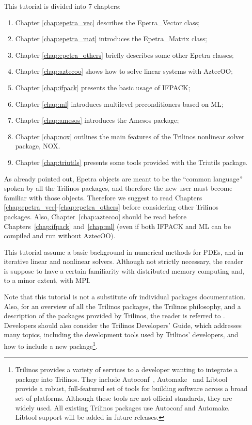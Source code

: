 This tutorial is divided into 7 chapters:
\begin{enumerate}
\item Chapter \ref{chap:epetra_vec} describes the Epetra\_Vector class;
\item Chapter \ref{chap:epetra_mat} introduces the Epetra\_Matrix
  class; 
\item Chapter \ref{chap:epetra_others} briefly describes some other
  Epetra classes;
\item Chapter \ref{chap:aztecoo} shows how to solve linear systems with
  AztecOO;
\item Chapter \ref{chap:ifpack} presents the basic usage of IFPACK;
\item Chapter \ref{chap:ml} introduces multilevel preconditioners based
  on ML;
\item Chapter \ref{chap:amesos} introduces the Amesos package;
\item Chapter \ref{chap:nox} outlines the main features of the Trilinos
  nonlinear solver package, NOX.
\item Chapter \ref{chap:triutils} presents some tools provided with the
  Triutils package. 
\end{enumerate}

\begin{remark}
  As already pointed out, Epetra objects are meant to be the ``common
  language'' spoken by all the Trilinos packages, and therefore the new
  user must become familiar with those objects. Therefore we suggest to
  read Chapters \ref{chap:epetra_vec}-\ref{chap:epetra_others} before
  considering other Trilinos packages. Also, Chapter~\ref{chap:aztecoo}
  should be read before Chapters~\ref{chap:ifpack} and~\ref{chap:ml}
  (even if both IFPACK and ML can be compiled and run without AztecOO).
\end{remark}

This tutorial assume a basic background in numerical methods for PDEs,
and in iterative linear and nonlinear solvers. Although not strictly
necessary, the reader is suppose to have a certain familiarity with
distributed memory computing and, to a minor extent, with MPI.

\smallskip

Note that this tutorial is not a substitute ofr individual packages
documentation. Also, for an overview of all the Trilinos packages, the
Trilinos philosophy, and a description of the packages provided by
Trilinos, the reader is referred to \cite{Trilinos-Overview}.
Developers should also consider the Trilinos Developers' Guide, which
addresses many topics, including the development tools used by Trilinos'
developers, and how to include a new package\footnote{ Trilinos provides
  a variety of services to a developer wanting to integrate a package
  into Trilinos.  They include Autoconf~\cite{Autoconf},
  Automake~\cite{Automake} and Libtool~\cite{Libtool} provide a robust,
  full-featured set of tools for building software across a broad set of
  platforms.  Although these tools are not official standards, they are
  widely used.  All existing Trilinos packages use Autoconf and
  Automake.  Libtool support will be added in future releases.}.

